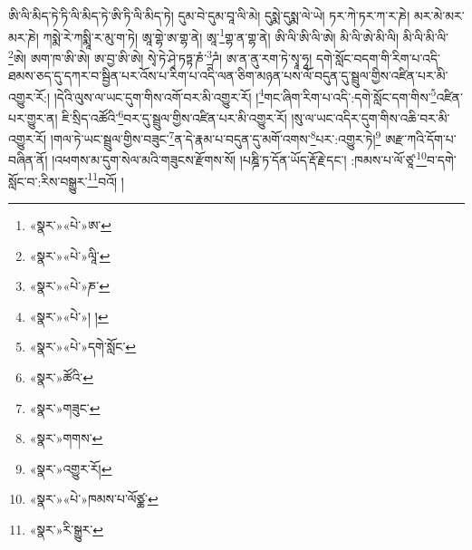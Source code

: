 ཨི་ལི་མིད་ཏེ་ཏི་ལི་མིད་ཏེ་ཨི་ཏི་ལི་མིད་ཏེ། དུམ་བེ་དུམ་བཱ་ལི་མེ། དུསྨེ་དུསྨ་ལེ་ཡེ། ཏར་ཀེ་ཏར་ཀ་ར་ཎེ། མར་མེ་མར་མར་ཎེ། ཀསྨེ་རེ་ཀསྨཱི་ར་མུ་ག་ཏེ། ཨཱ་གྷེ་ཨ་གྷ་ནེ། ཨཱ་\footnote{«སྣར་»«པེ་»ཨ་}གྷ་ན་གྷ་ནེ། ཨི་ལི་ཨི་ལི་ཨེ། མི་ལི་ཨེ་མི་ལི། མི་ལི་མི་ལི་\footnote{«སྣར་»«པེ་»ལཱི་}ཨེ། ཨག་ཁ་ཨི་ཨེ། ཨ་བྱ་ཨི་ཨེ། སྭེ་ཏེ་ཤྭེ་ཏཏྟ་ཎཾ་\footnote{«སྣར་»«པེ་»ཎ་}ཌཾ། ཨ་ན་ནུ་རག་ཏེ་སྭཱ་ཧཱ། དགེ་སློང་བདག་གི་རིག་པ་འདི་ཐམས་ཅད་དུ་དཀར་བ་སྦྱིན་པར་འོས་པ་རིག་པ་འདི་ལན་ཅིག་མཉན་པས་ལོ་བདུན་དུ་སྦྲུལ་གྱིས་འཛིན་པར་མི་འགྱུར་རོ:། །དེའི་ལུས་ལ་ཡང་དུག་གིས་འགོ་བར་མི་འགྱུར་རོ། །\footnote{«སྣར་»«པེ་»། །}གང་ཞིག་རིག་པ་འདི་:དགེ་སློང་དག་གིས་\footnote{«སྣར་»«པེ་»དགེ་སློང་}འཛིན་པར་གྱུར་ན། ཇི་སྲིད་འཚོའི་\footnote{«སྣར་»ཚོའི་}བར་དུ་སྦྲུལ་གྱིས་འཛིན་པར་མི་འགྱུར་རོ། །སུ་ལ་ཡང་འདིར་དུག་གིས་འཆི་བར་མི་འགྱུར་རོ། །གལ་ཏེ་ཡང་སྦྲུལ་གྱིས་བཟུང་\footnote{«སྣར་»གཟུང་}ན་དེ་རྣམ་པ་བདུན་དུ་མགོ་འགས་\footnote{«སྣར་»གགས་}པར་:འགྱུར་ཏེ།\footnote{«སྣར་»འགྱུར་རོ།} ཨརྫ་ཀའི་དོག་པ་བཞིན་ནོ། །འཕགས་མ་དུག་སེལ་མའི་གཟུངས་རྫོགས་སོ། །པཎྜི་ཏ་དོན་ཡོད་རྡོ་རྗེ་དང་། :ཁམས་པ་ལོ་ཙཱ་\footnote{«སྣར་»«པེ་»ཁམས་པ་ལོཙྪ་}བ་དགེ་སློང་བ་:རིས་བསྒྱུར་\footnote{«སྣར་»རི་སྒྱུར་}བའོ། ། 